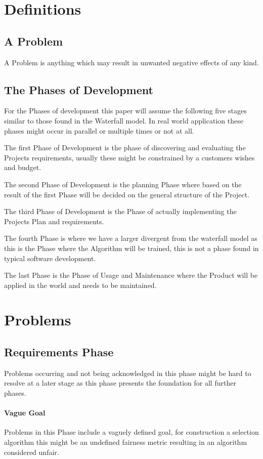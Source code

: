 \documentclass[sigconf,nonacm,natbib=false]{acmart}
\begin{document}
\section{Definitions}

\subsection{A Problem}
A Problem is anything which may result in unwanted negative effects of any kind.

\subsection{The Phases of Development}
For the Phases of development this paper will assume the following five stages similar to those found in the Waterfall model.
In real world application these phases might occur in parallel or multiple times or not at all.

The first Phase of Development is the phase of discovering and evaluating the Projects requirements, usually these might be constrained by a customers wishes and budget.

The second Phase of Development is the planning Phase where based on the result of the first Phase will be decided on the general structure of the Project.

The third Phase of Development is the Phase of actually implementing the Projects Plan and requirements.

The fourth Phase is where we have a larger divergent from the waterfall model as this is the Phase where the Algorithm will be trained, this is not a phase found in typical software development.

The last Phase is the Phase of Usage and Maintenance where the Product will be applied in the world and needs to be maintained.

\section{Problems}

\subsection{Requirements Phase}
Problems occurring and not being acknowledged in this phase
might be hard to resolve at a later stage as this phase presents the 
foundation for all further phases.

\paragraph{Vague Goal}
Problems in this Phase include a vaguely defined goal,
for construction a selection algorithm this might be 
an undefined fairness metric resulting in an algorithm considered unfair.
\end{document}
